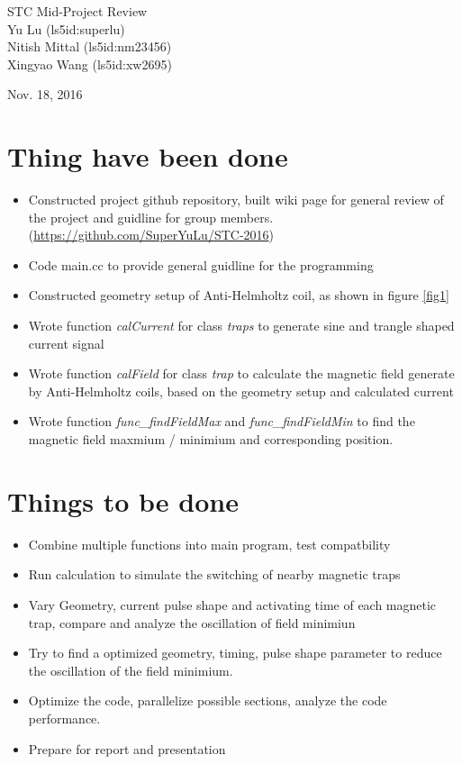 \documentclass[11pt, xcolor=dvipsnames]{article}
\begin{document}
\begingroup  
\centering
\LARGE STC Mid-Project Review\\[0.5em]
\large Yu Lu (ls5id:superlu) \\  Nitish Mittal (ls5id:nm23456)\\Xingyao Wang (ls5id:xw2695)\\[0.5em]\par 
\large Nov. 18, 2016\\
\endgroup
  

\section*{Thing have been done}
\begin{itemize}
\item Constructed project github repository, built wiki page for general review of the project and guidline for group members. (\url{https://github.com/SuperYuLu/STC-2016})
\item Code main.cc to provide general guidline for the programming
\item Constructed geometry setup of Anti-Helmholtz coil, as shown in figure \ref{fig1}
\item Wrote function \textit{calCurrent} for class \textit{traps} to generate sine and trangle shaped current signal
\item Wrote function \textit{calField} for class \textit{trap} to calculate the magnetic field generate by Anti-Helmholtz coils, based on the geometry setup and calculated current
\item Wrote function \textit{func\_findFieldMax} and \textit{func\_findFieldMin} to find the magnetic field maxmium / minimium and corresponding position.\\
\end{itemize}

\section*{Things to be done}
\begin{itemize}
\item Combine multiple functions into main program, test compatbility
\item Run calculation to simulate the switching of nearby magnetic traps
\item Vary Geometry, current pulse shape  and activating time of each magnetic trap, compare and analyze the oscillation of field minimiun
\item Try to find a optimized geometry, timing, pulse shape parameter to reduce the oscillation of the field minimium.
\item Optimize the code, parallelize possible sections, analyze the code performance.
\item Prepare for report and presentation
\end{itemize}
\end{document}
